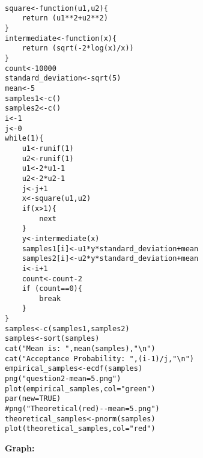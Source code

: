 \documentclass[11pt]{article}
\begin{document}
\begin{figure}[H]
  \centering
 \subfloat[Using R]{\texttt{[image: question2-mean=0.png]}}\\
\end{figure}
\begin{figure}[H]
  \centering
 \\
\end{figure}
\begin{figure}[H]
  \centering
 \\
\end{figure}

\begin{lstlisting}
square<-function(u1,u2){
	return (u1**2+u2**2)
}
intermediate<-function(x){
	return (sqrt(-2*log(x)/x))
}
count<-10000
standard_deviation<-sqrt(5)
mean<-5
samples1<-c()
samples2<-c()
i<-1
j<-0
while(1){
	u1<-runif(1)
	u2<-runif(1)
	u1<-2*u1-1
	u2<-2*u2-1
	j<-j+1
	x<-square(u1,u2)
	if(x>1){
		next
	}
	y<-intermediate(x)
	samples1[i]<-u1*y*standard_deviation+mean
	samples2[i]<-u2*y*standard_deviation+mean
	i<-i+1
	count<-count-2
	if (count==0){
		break
	}
}
samples<-c(samples1,samples2)
samples<-sort(samples)
cat("Mean is: ",mean(samples),"\n")
cat("Acceptance Probability: ",(i-1)/j,"\n")	
empirical_samples<-ecdf(samples)
png("question2-mean=5.png")
plot(empirical_samples,col="green")
par(new=TRUE)
#png("Theoretical(red)--mean=5.png")
theoretical_samples<-pnorm(samples)
plot(theoretical_samples,col="red")
\end{lstlisting}

\textbf{Graph: }\

\begin{figure}[H]
  \centering
 \subfloat[Using R]{\texttt{[image: question2-mean=5.png]}}\\
\end{figure}
\begin{figure}[H]
  \centering
 \subfloat[Using R]{\texttt{[image: Empirical(green)--mean=5.png]}}\\
\end{figure}
\begin{figure}[H]
  \centering
 \subfloat[Using R]{\texttt{[image: Theoretical(red)--mean=5.png]}}\\
\end{figure}
\end{document}
